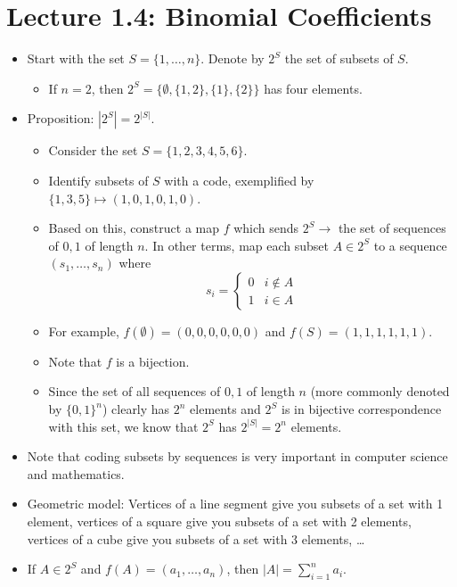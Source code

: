 \documentclass[../apprentice.tex]{subfiles}
\begin{document}
\section{Lecture 1.4: Binomial Coefficients}
\begin{itemize}
    \item Start with the set $S=\{1,\dots,n\}$. Denote by $2^S$ the set of subsets of $S$.
    \begin{itemize}
        \item If $n=2$, then $2^S=\{\emptyset,\{1,2\},\{1\},\{2\}\}$ has four elements.
    \end{itemize}
    \item Proposition: $|2^S|=2^{|S|}$.
    \begin{itemize}
        \item Consider the set $S=\{1,2,3,4,5,6\}$.
        \item Identify subsets of $S$ with a code, exemplified by $\{1,3,5\}\mapsto(1,0,1,0,1,0)$.
        \item Based on this, construct a map $f$ which sends $2^S\to$ the set of sequences of $0,1$ of length $n$. In other terms, map each subset $A\in 2^S$ to a sequence $(s_1,\dots,s_n)$ where
        \begin{equation*}
            s_i =
            \begin{cases}
                0 & i\notin A\\
                1 & i\in A
            \end{cases}
        \end{equation*}
        \item For example, $f(\emptyset)=(0,0,0,0,0,0)$ and $f(S)=(1,1,1,1,1,1)$.
        \item Note that $f$ is a bijection.
        \item Since the set of all sequences of $0,1$ of length $n$ (more commonly denoted by $\{0,1\}^n$) clearly has $2^n$ elements and $2^S$ is in bijective correspondence with this set, we know that $2^S$ has $2^{|S|}=2^n$ elements.
    \end{itemize}
    \item Note that coding subsets by sequences is very important in computer science and mathematics.
    \item Geometric model: Vertices of a line segment give you subsets of a set with 1 element, vertices of a square give you subsets of a set with 2 elements, vertices of a cube give you subsets of a set with 3 elements, \dots
    \item If $A\in 2^S$ and $f(A)=(a_1,\dots,a_n)$, then $|A|=\sum_{i=1}^na_i$.

\end{itemize}
\end{document}
